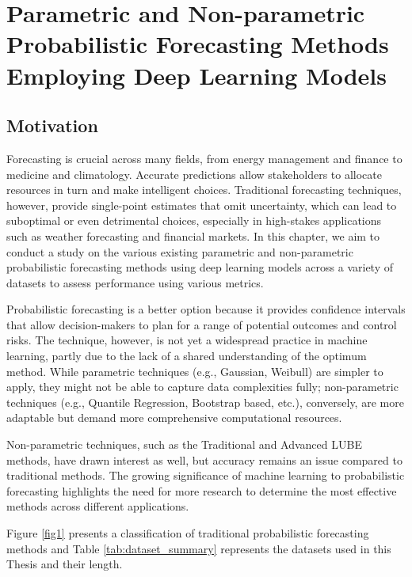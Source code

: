 \chapter{Parametric and Non-parametric Probabilistic Forecasting Methods Employing Deep Learning Models} \label{Unstructured} 

\section{ Motivation}
Forecasting is crucial across many fields, from energy management and finance to medicine and climatology. Accurate predictions allow stakeholders to allocate resources in turn and make intelligent choices. Traditional forecasting techniques, however, provide single-point estimates that omit uncertainty, which can lead to suboptimal or even detrimental choices, especially in high-stakes applications such as weather forecasting and financial markets. In this chapter, we aim to conduct a study on the various existing parametric and non-parametric probabilistic forecasting methods using deep learning models across a variety of datasets to assess performance using various metrics.

Probabilistic forecasting is a better option because it provides confidence intervals that allow decision-makers to plan for a range of potential outcomes and control risks. The technique, however, is not yet a widespread practice in machine learning, partly due to the lack of a shared understanding of the optimum method. While parametric techniques (e.g., Gaussian, Weibull) are simpler to apply, they might not be able to capture data complexities fully; non-parametric techniques (e.g., Quantile Regression, Bootstrap based, etc.), conversely, are more adaptable but demand more comprehensive computational resources.

Non-parametric techniques, such as the Traditional and Advanced LUBE methods, have drawn interest as well, but accuracy remains an issue compared to traditional methods. The growing significance of machine learning to probabilistic forecasting highlights the need for more research to determine the most effective methods across different applications.

Figure \ref{fig1} presents a classification of traditional probabilistic forecasting methods and Table \ref{tab:dataset_summary} represents the datasets used in this Thesis and their length.

